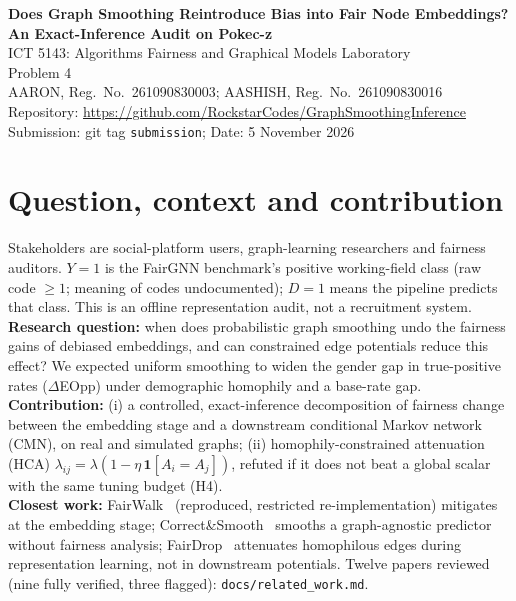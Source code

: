 \documentclass[11pt,a4paper]{article}
\newcommand{\ci}[3]{#1\,[#2,\,#3]}
\newcommand{\ProjectTitle}{Does Graph Smoothing Reintroduce Bias into Fair Node Embeddings? An Exact-Inference Audit on Pokec-z}
\begin{document}
\begin{center}
{\Large\bfseries \ProjectTitle}\\[4pt]
ICT 5143: Algorithms Fairness and Graphical Models Laboratory\\
Problem 4\\
AARON, Reg.\ No.\ 261090830003; AASHISH, Reg.\ No.\ 261090830016\\
{\small Repository: \url{https://github.com/RockstarCodes/GraphSmoothingInference}\\
Submission: git tag \texttt{submission}; Date: 5 November 2026}
\end{center}
\begin{abstract}
We ask whether exact pairwise Markov smoothing undoes the fairness gains of FairWalk embeddings in Pokec-z working-field prediction. On a fixed 2{,}000-node subgraph (5 seeds, 1{,}000 graph-block bootstrap replicates) uniform smoothing changed the gender equal-opportunity gap of the FairWalk pipeline by \RHoneEst{} \ci{}{\RHoneLo}{\RHoneHi} (Holm $p=\RHonePholm$), and our homophily-constrained edge attenuation did not differ from a global scalar (\RHfourEst{} \ci{}{\RHfourLo}{\RHfourHi}). The core graph is gender-heterophilous, so the mechanism is absent. In simulation, smoothing widened group gaps only when demographic homophily and a base-rate gap were both present, and a global scalar matched HCA there too. Findings are subgraph-specific.
\end{abstract}

\section{Question, context and contribution}
Stakeholders are social-platform users, graph-learning researchers and fairness auditors. $Y{=}1$ is the FairGNN benchmark's positive working-field class (raw code $\ge 1$; meaning of codes undocumented); $D{=}1$ means the pipeline predicts that class. This is an offline representation audit, not a recruitment system.
\textbf{Research question:} when does probabilistic graph smoothing undo the fairness gains of debiased embeddings, and can constrained edge potentials reduce this effect? We expected uniform smoothing to widen the gender gap in true-positive rates ($\Delta$EOpp) under demographic homophily and a base-rate gap.\\
\textbf{Contribution:} (i) a controlled, exact-inference decomposition of fairness change between the embedding stage and a downstream conditional Markov network (CMN), on real and simulated graphs; (ii) homophily-constrained attenuation (HCA) $\lambda_{ij}=\lambda(1-\eta\,\mathbf 1[A_i{=}A_j])$, refuted if it does not beat a global scalar with the same tuning budget (H4).\\
\textbf{Closest work:} FairWalk~\cite{fairwalk} (reproduced, restricted re-implementation) mitigates at the embedding stage; Correct\&Smooth~\cite{cs} smooths a graph-agnostic predictor without fairness analysis; FairDrop~\cite{fairdrop} attenuates homophilous edges during representation learning, not in downstream potentials. Twelve papers reviewed (nine fully verified, three flagged): \texttt{docs/related\_work.md}.
\end{document}
